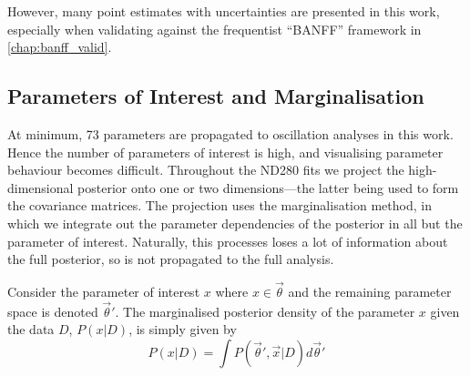 However, many point estimates with uncertainties are presented in this work, especially when validating against the frequentist ``BANFF'' framework in \autoref{chap:banff_valid}.
 
\subsection{Parameters of Interest and Marginalisation}
At minimum, 73 parameters are propagated to oscillation analyses in this work. Hence the number of parameters of interest is high, and visualising parameter behaviour becomes difficult. Throughout the ND280 fits we project the high-dimensional posterior onto one or two dimensions---the latter being used to form the covariance matrices. The projection uses the marginalisation method, in which we integrate out the parameter dependencies of the posterior in all but the parameter of interest. Naturally, this processes loses a lot of information about the full posterior, so is not propagated to the full analysis.

Consider the parameter of interest $x$ where $x \in \vec{\theta}$ and the remaining parameter space is denoted $\vec{\theta}'$. The marginalised posterior density of the parameter $x$ given the data $D$, $P(x|D)$, is simply given by
\begin{equation}
P(x|D) = \int P(\vec{\theta}',\vec{x}|D) d\vec{\theta}'
\end{equation}

